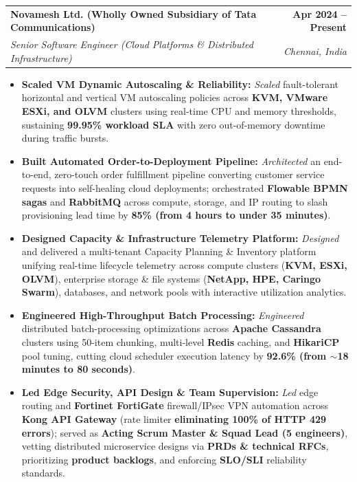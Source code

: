 \documentclass[letterpaper,9.5pt]{article}
\makeatletter
\newcommand{\resumeItem}[1]{
  \item\small{{#1 \vspace{-2pt}}}
}
\newcommand{\resumeSubheading}[4]{
  \vspace{-2.5pt}\item
    \begin{tabular*}{1.0\textwidth}[t]{l@{\extracolsep{\fill}}r}
      \textbf{#1} & \textbf{\small #2} \\
      \textit{\small#3} & \textit{\small #4} \\
    \end{tabular*}\vspace{-5pt}
}
\newcommand{\resumeItemListStart}{\begin{itemize}[leftmargin=0.15in, rightmargin=0.0in]}
\newcommand{\resumeItemListEnd}{\end{itemize}\vspace{-3pt}}
\makeatother
\begin{document}
    \resumeSubheading
      {Novamesh Ltd. (Wholly Owned Subsidiary of Tata Communications)}{Apr 2024 -- Present}
      {Senior Software Engineer (Cloud Platforms \& Distributed Infrastructure)}{Chennai, India}
      \resumeItemListStart
        \resumeItem{\textbf{Scaled VM Dynamic Autoscaling \& Reliability:} \emph{Scaled} fault-tolerant horizontal and vertical VM autoscaling policies across \textbf{KVM, VMware ESXi, and OLVM} clusters using real-time CPU and memory thresholds, sustaining \textbf{99.95\% workload SLA} with zero out-of-memory downtime during traffic bursts.}
        \resumeItem{\textbf{Built Automated Order-to-Deployment Pipeline:} \emph{Architected} an end-to-end, zero-touch order fulfillment pipeline converting customer service requests into self-healing cloud deployments; orchestrated \textbf{Flowable BPMN sagas} and \textbf{RabbitMQ} across compute, storage, and IP routing to slash provisioning lead time by \textbf{85\% (from 4 hours to under 35 minutes)}.}
        \resumeItem{\textbf{Designed Capacity \& Infrastructure Telemetry Platform:} \emph{Designed} and delivered a multi-tenant Capacity Planning \& Inventory platform unifying real-time lifecycle telemetry across compute clusters (\textbf{KVM, ESXi, OLVM}), enterprise storage \& file systems (\textbf{NetApp, HPE, Caringo Swarm}), databases, and network pools with interactive utilization analytics.}
        \resumeItem{\textbf{Engineered High-Throughput Batch Processing:} \emph{Engineered} distributed batch-processing optimizations across \textbf{Apache Cassandra} clusters using 50-item chunking, multi-level \textbf{Redis} caching, and \textbf{HikariCP} pool tuning, cutting cloud scheduler execution latency by \textbf{92.6\% (from $\sim$18 minutes to 80 seconds)}.}
        \resumeItem{\textbf{Led Edge Security, API Design \& Team Supervision:} \emph{Led} edge routing and \textbf{Fortinet FortiGate} firewall/IPsec VPN automation across \textbf{Kong API Gateway} (rate limiter \textbf{eliminating 100\% of HTTP 429 errors}); served as \textbf{Acting Scrum Master \& Squad Lead (5 engineers)}, vetting distributed microservice designs via \textbf{PRDs \& technical RFCs}, prioritizing \textbf{product backlogs}, and enforcing \textbf{SLO/SLI} reliability standards.}
      \resumeItemListEnd
\end{document}
